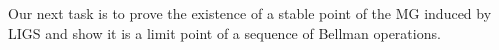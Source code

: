 \documentclass{article}
\begin{document}
% 
% 
Our next task is to prove the existence of a stable point of the MG induced by LIGS and show it is a limit point of a sequence of Bellman operations. 
% 
% 
% 
% 
% 
\end{document}
